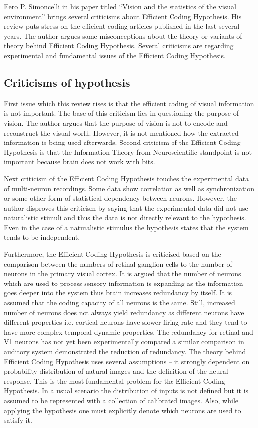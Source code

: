 \documentclass[twoside]{article}
\begin{document}
\begin{multicols}{2}
Eero P. Simoncelli in his paper titled ``Vision and the statistics of the visual environment'' brings several criticisms about Efficient Coding Hypothesis. His review puts stress on the efficient coding articles published in the last several years. The author argues some misconceptions about the theory or variants of theory behind Efficient Coding Hypothesis. Several criticisms are regarding experimental and fundamental issues of the Efficient Coding Hypothesis.

\subsection{Criticisms of hypothesis}

First issue which this review rises is that the efficient coding of visual information is not important. The base of this criticism lies in questioning the purpose of vision. The author argues that the purpose of vision is not to encode and reconstruct the visual world. However, it is not mentioned how the extracted information is being used afterwards. 
Second criticism of the Efficient Coding Hypothesis is that the Information Theory from Neuroscientific standpoint is not important because brain does not work with bits. 

Next criticism of the Efficient Coding Hypothesis touches the experimental data of multi-neuron recordings. Some data show correlation as well as synchronization or some other form of statistical dependency between neurons.  However, the author disproves this criticism by saying that the experimental data did not use naturalistic stimuli and thus the data is not directly relevant to the hypothesis. Even in the case of a naturalistic stimulus the hypothesis states that the system tends to be independent. 

Furthermore, the Efficient Coding Hypothesis is criticized based on the comparison between the numbers of retinal ganglion cells to the number of neurons in the primary visual cortex. It is argued that the number of neurons which are used to process sensory information is expanding as the information goes deeper into the system thus brain increases redundancy by itself.  It is assumed that the coding capacity of all neurons is the same. Still, increased number of neurons does not always yield redundancy as different neurons have different properties i.e. cortical neurons have slower firing rate and they tend to have more complex temporal dynamic properties. The redundancy for retinal and V1 neurons has not yet been experimentally compared a similar comparison in auditory system demonstrated the reduction of redundancy. 
The theory behind Efficient Coding Hypothesis uses several assumptions – it strongly dependent on probability distribution of natural images and the definition of the neural response.  This is the most fundamental problem for the Efficient Coding Hypothesis. In a usual scenario the distribution of inputs is not defined but it is assumed to be represented with a collection of calibrated images. Also, while applying the hypothesis one must explicitly denote which neurons are used to satisfy it. 


\end{multicols}
\end{document}
